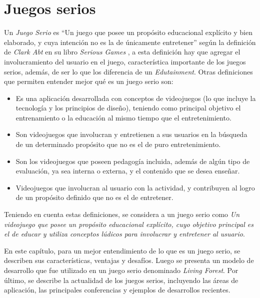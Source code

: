 \chapter{Juegos serios}
\label{chap:juegos_serios}

Un \emph{Juego Serio} es \enquote{Un juego que posee un propósito educacional
    explícito y bien elaborado, y cuya intención no es la de únicamente
    entretener} según la definición de \emph{Clark Abt} en su libro
\emph{Serious Games} \cite{abt1987serious}, a esta definición hay que agregar el
involucramiento del usuario en el juego, característica importante de los juegos
serios, además, de ser lo que los diferencia de un
\emph{Edutainment}\cite{resnick:2004,charsky:2010}. Otras definiciones que
permiten entender mejor qué es un juego serio son:

\begin{itemize}
    \item Es una aplicación desarrollada con conceptos de videojuegos (lo que
        incluye la tecnología y los principios de diseño), teniendo como
        principal objetivo el entrenamiento o la educación al mismo tiempo que
        el entretenimiento\cite{ludus:sg}.
    \item Son videojuegos que involucran y entretienen a sus usuarios en la
        búsqueda de un determinado propósito que no es el de puro
        entretenimiento\cite{ludus:sg}.
    \item Son los videojuegos que poseen pedagogía incluida, además de algún
        tipo de evaluación, ya sea interna o externa, y el contenido que se
        desea enseñar\cite{damien:sg,sg:aoverview}.
    \item Videojuegos que involucran al usuario con la actividad, y contribuyen
        al logro de un propósito definido que no es el de
        entretener\cite{sg:aoverview}.
\end{itemize}

Teniendo en cuenta estas definiciones, se considera a un juego serio como
\emph{Un videojuego que posee un propósito educacional explícito, cuyo objetivo
    principal es el de educar y utiliza conceptos lúdicos para involucrar y
    entretener al usuario}.

En este capítulo, para un mejor entendimiento de lo que es un juego serio, se
describen sus características, ventajas y desafíos. Luego se presenta un modelo
de desarrollo que fue utilizado en un juego serio denominado \textit{Living
    Forest}. Por último, se describe la actualidad de los juegos serios,
incluyendo las áreas de aplicación, las principales conferencias y ejemplos de
desarrollos recientes.








